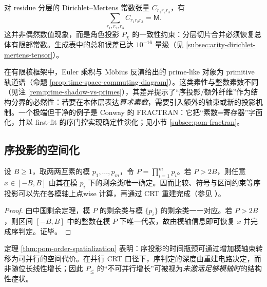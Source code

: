 \begin{remark}[分层常数的总和守恒]\label{rem:pom-chi-sum}
对 residue 分层的 Dirichlet--Mertens 常数张量 $C_{r_1r_2r_3}$，有
\[
\sum_{r_1,r_2,r_3} C_{r_1r_2r_3}=\mathsf{M}.
\]
这并非偶然数值现象，而是角色投影 $P_\chi$ 的一致性约束：分层切片合并必须恢复总体有限部常数。生成表中的总和误差已达 $10^{-16}$ 量级（见 \ref{subsec:arity-dirichlet-mertens-tensor}）。
\end{remark}

\begin{remark}[有限核的素数影子与算术素数的分界]
在有限核框架中，Euler 乘积与 Möbius 反演给出的 prime-like 对象为 primitive 轨道谱（命题 \ref{prop:time-space-commuting-diagram}）。这类素性与整数素数不同（见注 \ref{rem:prime-shadow-vs-primes}），其差异提示了“序投影/额外纤维”作为结构分界的必然性：若要在本体层表达\emph{算术素数}，需要引入额外的轴束或新的投影机制。一个极端但干净的例子是 Conway 的 FRACTRAN：它把“素数=寄存器”字面化，并以 first-fit 的序门控实现确定性演化；见小节 \ref{subsec:pom-fractran}。
\end{remark}

\subsection{序投影的空间化}\label{subsec:pom-order-spatialization}
\begin{theorem}[序投影的空间化定律]\label{thm:pom-order-spatialization}
设 $B\ge 1$，取两两互素的模 $p_1,\dots,p_m$，令 $P=\prod_{i=1}^m p_i$。若 $P>2B$，则任意 $x\in[-B,B]$ 由其在模 $p_i$ 下的剩余类唯一确定。因而比较、符号与区间约束等序投影可以先在各模轴上点wise 计算，再通过 CRT 重建完成（参见 \cite{Apostol1976}）。
\end{theorem}
\begin{proof}
由中国剩余定理，模 $P$ 的剩余类与模 $\{p_i\}$ 的剩余类一一对应。若 $P>2B$，则区间 $[-B,B]$ 中的整数在模 $P$ 下唯一代表，故由模轴信息即可恢复 $x$ 并完成序判定。证毕。
\end{proof}



\begin{remark}[时间—空间转移的结构后果]
定理 \ref{thm:pom-order-spatialization} 表明：序投影的时间瓶颈可通过增加模轴束转移为可并行的空间代价。在并行 CRT 口径下，序判定的深度由重建电路决定，而非随位长线性增长；因此 $P_{\le}$ 的“不可并行增长”可被视为\emph{未激活足够模轴时}的结构性症状。
\end{remark}

